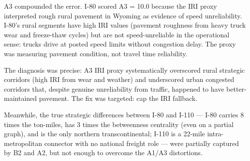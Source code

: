 A3 compounded the error. I-80 scored A3 = 10.0 because the IRI proxy interpreted rough rural pavement in Wyoming as evidence of speed unreliability. I-80's rural segments have high IRI values (pavement roughness from heavy truck wear and freeze-thaw cycles) but are not speed-unreliable in the operational sense: trucks drive at posted speed limits without congestion delay. The proxy was measuring pavement condition, not travel time reliability.

The diagnosis was precise: A3 IRI proxy systematically overscored rural strategic corridors (high IRI from wear and weather) and underscored urban congested corridors that, despite genuine unreliability from traffic, happened to have better-maintained pavement. The fix was targeted: cap the IRI fallback.

Meanwhile, the true strategic differences between I-80 and I-110 --- I-80 carries 8 times the ton-miles, has 3 times the betweenness centrality (even on a partial graph), and is the only northern transcontinental; I-110 is a 22-mile intra-metropolitan connector with no national freight role --- were partially captured by B2 and A2, but not enough to overcome the A1/A3 distortions.
